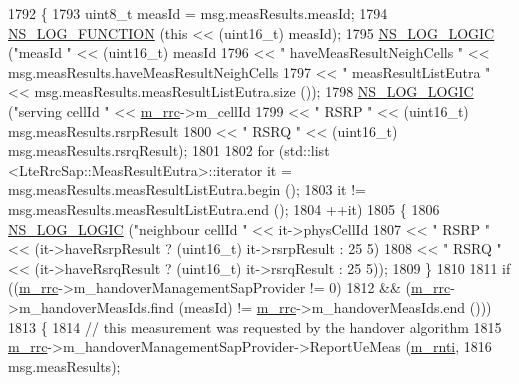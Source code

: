 \begin{DoxyCode}
1792 \{
1793   uint8\_t measId = msg.measResults.measId;
1794   \hyperlink{log-macros-disabled_8h_a90b90d5bad1f39cb1b64923ea94c0761}{NS\_LOG\_FUNCTION} (\textcolor{keyword}{this} << (uint16\_t) measId);
1795   \hyperlink{group__logging_ga88acd260151caf2db9c0fc84997f45ce}{NS\_LOG\_LOGIC} (\textcolor{stringliteral}{"measId "} << (uint16\_t) measId
1796                           << \textcolor{stringliteral}{" haveMeasResultNeighCells "} << msg.measResults.haveMeasResultNeighCells
1797                           << \textcolor{stringliteral}{" measResultListEutra "} << msg.measResults.measResultListEutra.size ());
1798   \hyperlink{group__logging_ga88acd260151caf2db9c0fc84997f45ce}{NS\_LOG\_LOGIC} (\textcolor{stringliteral}{"serving cellId "} << \hyperlink{classns3_1_1UeManager_ab4405e9f354c66e7c1a4c95832290f5b}{m\_rrc}->m\_cellId
1799                                   << \textcolor{stringliteral}{" RSRP "} << (uint16\_t) msg.measResults.rsrpResult
1800                                   << \textcolor{stringliteral}{" RSRQ "} << (uint16\_t) msg.measResults.rsrqResult);
1801 
1802   \textcolor{keywordflow}{for} (std::list <LteRrcSap::MeasResultEutra>::iterator it = msg.measResults.measResultListEutra.begin ();
1803        it != msg.measResults.measResultListEutra.end ();
1804        ++it)
1805     \{
1806       \hyperlink{group__logging_ga88acd260151caf2db9c0fc84997f45ce}{NS\_LOG\_LOGIC} (\textcolor{stringliteral}{"neighbour cellId "} << it->physCellId
1807                                         << \textcolor{stringliteral}{" RSRP "} << (it->haveRsrpResult ? (uint16\_t) it->rsrpResult : 25
      5)
1808                                         << \textcolor{stringliteral}{" RSRQ "} << (it->haveRsrqResult ? (uint16\_t) it->rsrqResult : 25
      5));
1809     \}
1810 
1811   \textcolor{keywordflow}{if} ((\hyperlink{classns3_1_1UeManager_ab4405e9f354c66e7c1a4c95832290f5b}{m\_rrc}->m\_handoverManagementSapProvider != 0)
1812       && (\hyperlink{classns3_1_1UeManager_ab4405e9f354c66e7c1a4c95832290f5b}{m\_rrc}->m\_handoverMeasIds.find (measId) != \hyperlink{classns3_1_1UeManager_ab4405e9f354c66e7c1a4c95832290f5b}{m\_rrc}->m\_handoverMeasIds.end ()))
1813     \{
1814       \textcolor{comment}{// this measurement was requested by the handover algorithm}
1815       \hyperlink{classns3_1_1UeManager_ab4405e9f354c66e7c1a4c95832290f5b}{m\_rrc}->m\_handoverManagementSapProvider->ReportUeMeas (\hyperlink{classns3_1_1UeManager_a5a72b4fe818f21993bd7f05d7e2c4f83}{m\_rnti},
1816                                                             msg.measResults);

\end{DoxyCode}
